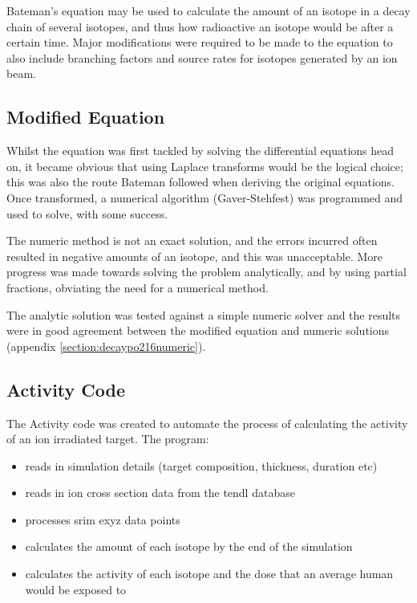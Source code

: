 Bateman's equation may be used to calculate the amount of an isotope in a decay chain of several isotopes, and thus how radioactive an isotope would be after a certain time.  Major modifications were required to be made to the equation to also include branching factors and source rates for isotopes generated by an ion beam.

\subsection{Modified Equation}

Whilst the equation was first tackled by solving the differential equations head on, it became obvious that using Laplace transforms would be the logical choice; this was also the route Bateman followed when deriving the original equations.  Once transformed, a numerical algorithm (Gaver-Stehfest) was programmed and used to solve, with some success.  

The numeric method is not an exact solution, and the errors incurred often resulted in negative amounts of an isotope, and this was unacceptable.  More progress was made towards solving the problem analytically, and by using partial fractions, obviating the need for a numerical method. 

The analytic solution was tested against a simple numeric solver and the results were in good agreement between the modified equation and numeric solutions (appendix \ref{section:decaypo216numeric}).

\subsection{Activity Code}

The Activity code was created to automate the process of calculating the activity of an ion irradiated target.  The program:

\begin{itemize}
\item reads in simulation details (target composition, thickness, duration etc)
\item reads in ion cross section data from the \acrshort{tendl} database
\item processes \acrshort{srim} exyz data points
\item calculates the amount of each isotope by the end of the simulation
\item calculates the activity of each isotope and the dose that an average human would be exposed to
\end{itemize}

